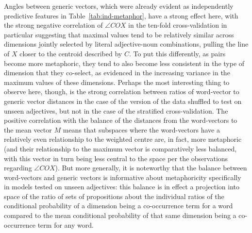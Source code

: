 Angles between generic vectors, which were already evident as independently predictive features in Table~\ref{tab:ind-metaphor}, have a strong effect here, with the strong negative correlation of $\angle COX$ in the ten-fold cross-validation in particular suggesting that maximal values tend to be relatively similar across dimensions jointly selected by literal adjective-noun combinations, pulling the line of $X$ closer to the centroid described by $C$.  To put this differently, as pairs become more metaphoric, they tend to also become less consistent in the type of dimension that they co-select, as evidenced in the increasing variance in the maximum values of these dimensions.  Perhaps the most interesting thing to observe here, though, is the strong correlation between ratios of word-vector to generic vector distances in the case of the version of the data shuffled to test on unseen adjectives, but not in the case of the stratified cross-validation.  The positive correlation with the balance of the distances from the word-vectors to the mean vector $M$ means that subspaces where the word-vectors have a relatively even relationship to the weighted centre are, in fact, more metaphoric (and their relationship to the maximum vector is comparatively less balanced, with this vector in turn being less central to the space per the observations regarding $\angle COX$).  But more generally, it is noteworthy that the balance between word-vectors and generic vectors is informative about metaphoricity specifically in models tested on unseen adjectives: this balance is in effect a projection into space of the ratio of sets of propositions about the individual ratios of the conditional probability of a dimension being a co-occurrence term for a word compared to the mean conditional probability of that same dimension being a co-occurrence term for any word.


